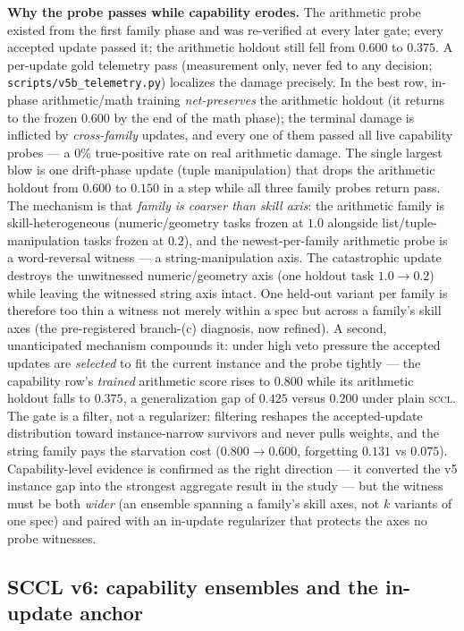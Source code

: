 \documentclass[10pt,conference]{IEEEtran}
\begin{document}
\textbf{Why the probe passes while capability erodes.} The arithmetic probe existed from the first family phase and was re-verified at every later gate; every accepted update passed it; the arithmetic holdout still fell from $0.600$ to $0.375$. A per-update gold telemetry pass (measurement only, never fed to any decision; \texttt{scripts/v5b\_telemetry.py}) localizes the damage precisely. In the best row, in-phase arithmetic/math training \emph{net-preserves} the arithmetic holdout (it returns to the frozen $0.600$ by the end of the math phase); the terminal damage is inflicted by \emph{cross-family} updates, and every one of them passed all live capability probes --- a $0\%$ true-positive rate on real arithmetic damage. The single largest blow is one drift-phase update (tuple manipulation) that drops the arithmetic holdout from $0.600$ to $0.150$ in a step while all three family probes return pass. The mechanism is that \emph{family is coarser than skill axis}: the arithmetic family is skill-heterogeneous (numeric/geometry tasks frozen at $1.0$ alongside list/tuple-manipulation tasks frozen at $0.2$), and the newest-per-family arithmetic probe is a word-reversal witness --- a string-manipulation axis. The catastrophic update destroys the unwitnessed numeric/geometry axis (one holdout task $1.0 \to 0.2$) while leaving the witnessed string axis intact. One held-out variant per family is therefore too thin a witness not merely within a spec but across a family's skill axes (the pre-registered branch-(c) diagnosis, now refined). A second, unanticipated mechanism compounds it: under high veto pressure the accepted updates are \emph{selected} to fit the current instance and the probe tightly --- the capability row's \emph{trained} arithmetic score rises to $0.800$ while its arithmetic holdout falls to $0.375$, a generalization gap of $0.425$ versus $0.200$ under plain \textsc{sccl}. The gate is a filter, not a regularizer: filtering reshapes the accepted-update distribution toward instance-narrow survivors and never pulls weights, and the string family pays the starvation cost ($0.800 \to 0.600$, forgetting $0.131$ vs $0.075$). Capability-level evidence is confirmed as the right direction --- it converted the v5 instance gap into the strongest aggregate result in the study --- but the witness must be both \emph{wider} (an ensemble spanning a family's skill axes, not $k$ variants of one spec) and paired with an in-update regularizer that protects the axes no probe witnesses.

\subsection*{SCCL v6: capability ensembles and the in-update anchor}
\label{sec:v6}
\end{document}
